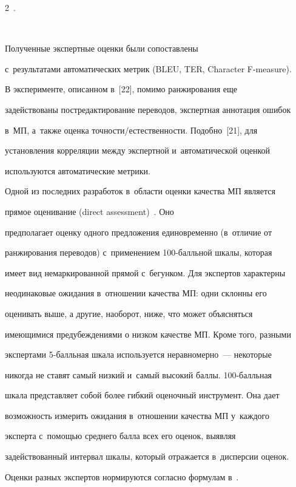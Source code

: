 \begin{multicols}{2}
\,.


$$


 Полученные экспертные оценки были сопоставлены 


с~результатами автоматических метрик (BLEU, TER, Character F-measure).


  


  В эксперименте, описанном в~[22], помимо ранжирования еще 


задействованы постредактирование переводов, экспертная аннотация ошибок 


в~МП, а~также оценка точности/естественности. Подобно~[21], для 


установления корреляции между экспертной и~автоматической оценкой 


используются автоматические метрики.


  


  Одной из последних разработок в~области оценки качества МП является 


прямое оценивание (direct assessment)~\cite[с.~49--50]{10-nur}. Оно 


предполагает оценку одного предложения единовременно (в~отличие от 


ранжирования переводов) с~применением 100-балль\-ной шкалы, которая 


имеет вид немаркированной прямой с~бегунком. Для экспертов характерны 


неодинаковые ожидания в~отношении качества МП: одни склонны его 


оценивать выше, а другие, наоборот, ниже, что может объясняться 


имеющимися предубеждениями о низком качестве МП. Кроме того, разными 


экспертами 5-балль\-ная шкала используется неравномерно~--- некоторые 


никогда не ставят самый низкий и~самый высокий баллы. 100-балль\-ная 


шкала представляет собой более гибкий оценочный инструмент. Она дает 


возможность измерить ожидания в~отношении качества МП у~каждого 


эксперта с~помощью среднего балла всех его оценок, выявляя 


задействованный интервал шкалы, который отражается в~дисперсии оценок. 


Оценки разных экспертов нормируются согласно формулам в~\cite[с.~49--50]{10-nur}. 



\end{multicols}
